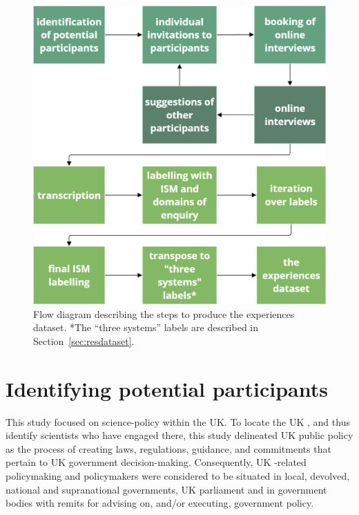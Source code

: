 




\begin{figure}[!ht]
    \centering
    \includegraphics[width=.75\linewidth]{figures/method_flow.png}
    \caption{Flow diagram describing the steps to produce the experiences dataset. *The ``three systems'' labels are described in Section~\ref{sec:resdataset}.}
    \label{fig:metflowchart}
\end{figure}

\section{Identifying potential participants}\label{sec:metidentify}
This study focused on \CAN{} science-policy within the UK. To locate the UK \SPI, and thus identify scientists who have engaged there, this study delineated UK public policy as the process of creating laws, regulations, guidance, and commitments that pertain to UK government decision-making. Consequently, UK \CAN-related policymaking and policymakers were considered to be situated in local, devolved, national and supranational governments, UK parliament and in government bodies with remits for advising on, and/or executing, \CAN{} government policy.

